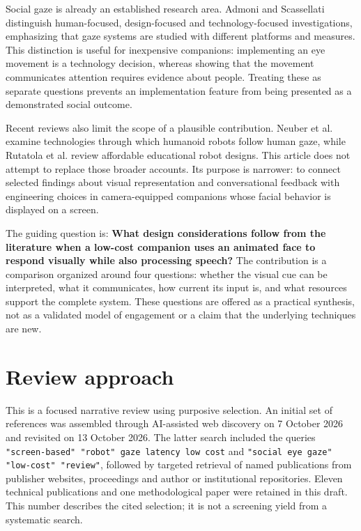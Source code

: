 \documentclass[11pt,a4paper]{article}
\begin{document}
Social gaze is already an established research area. Admoni and Scassellati \cite{r1} distinguish human-focused, design-focused and technology-focused investigations, emphasizing that gaze systems are studied with different platforms and measures. This distinction is useful for inexpensive companions: implementing an eye movement is a technology decision, whereas showing that the movement communicates attention requires evidence about people. Treating these as separate questions prevents an implementation feature from being presented as a demonstrated social outcome.

Recent reviews also limit the scope of a plausible contribution. Neuber et al. \cite{r2} examine technologies through which humanoid robots follow human gaze, while Rutatola et al. \cite{r4} review affordable educational robot designs. This article does not attempt to replace those broader accounts. Its purpose is narrower: to connect selected findings about visual representation and conversational feedback with engineering choices in camera-equipped companions whose facial behavior is displayed on a screen.

The guiding question is: \textbf{What design considerations follow from the literature when a low-cost companion uses an animated face to respond visually while also processing speech?} The contribution is a comparison organized around four questions: whether the visual cue can be interpreted, what it communicates, how current its input is, and what resources support the complete system. These questions are offered as a practical synthesis, not as a validated model of engagement or a claim that the underlying techniques are new.

\section{Review approach}

This is a focused narrative review using purposive selection. An initial set of references was assembled through AI-assisted web discovery on 7 October 2026 and revisited on 13 October 2026. The latter search included the queries \texttt{"screen-based" "robot" gaze latency low cost} and \texttt{"social eye gaze" "low-cost" "review"}, followed by targeted retrieval of named publications from publisher websites, proceedings and author or institutional repositories. Eleven technical publications and one methodological paper were retained in this draft. This number describes the cited selection; it is not a screening yield from a systematic search.
\end{document}
